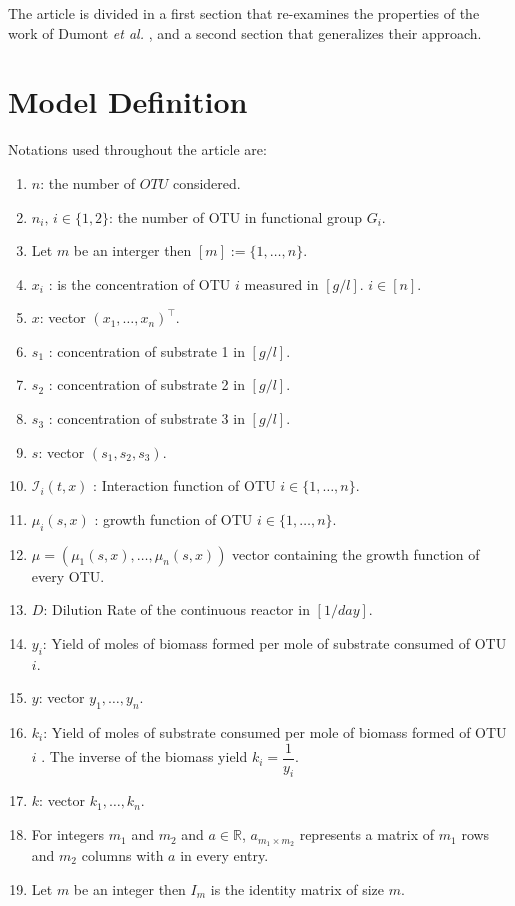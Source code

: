 \documentclass[3p,times]{elsarticle}
\newcommand{\R}{\mathbb{R}}
\newcommand{\I}{\mathcal{I}}
\begin{document}
The article is divided in a first section that re-examines the properties of the work of Dumont \textit{et al.} \cite{Dumont2016}, and a second section that generalizes their approach. 

\section{Model Definition}

Notations used throughout the article are:
\begin{enumerate}
	\item $n$: the number of $OTU$ considered.
	\item $n_i, \, i \in \{1,2\}$: the number of OTU in functional group $G_i$.
	\item Let $m$ be an interger then $[m]:=\{1,\dots,n \}$. 
	\item $x_i$ :  is the concentration of OTU $i$ measured in $[g/l]$. $i \in [n]$. 
	\item $x$: vector $(x_1,\dots,x_n)^\top$.
	\item $s_1$ : concentration of substrate 1 in $[g/l]$.
	\item $s_2$ : concentration of substrate 2 in $[g/l]$. 
	\item $s_3$ : concentration of substrate 3 in $[g/l]$.
	\item $s$:  vector $(s_1,s_2,s_3)$.
	\item $\I_i(t,x)$ : Interaction function of OTU $i \in \{1,\dots,n\}$.
	\item $\mu_i(s,x)$ : growth function of OTU $i \in \{1,\dots,n\}$.
	\item $\mu = (\mu_1(s,x), \dots, \mu_n(s,x))$ vector containing the growth function of every OTU.
	\item $D$: Dilution Rate of the continuous reactor in $[1/day]$. 
	\item $y_i$: Yield of moles of biomass formed per mole of substrate consumed of OTU $i$.
	\item $y$: vector $y_1,\dots,y_n$.
	\item $k_i$: Yield of  moles of substrate consumed per mole of biomass formed of OTU $i$ . The inverse of the biomass yield $k_i = \dfrac{1}{y_i}$.
	\item $k$: vector $k_1,\dots,k_n$.
	\item For integers $m_1$ and $m_2$ and $a \in \R$, $a_{m_1 \times m_2}$ represents a matrix of $m_1$ rows and $m_2$ columns with $a$ in every entry. 
	\item Let $m$ be an integer then $I_m$ is the identity matrix of size $m$.
\end{enumerate}
\end{document}
